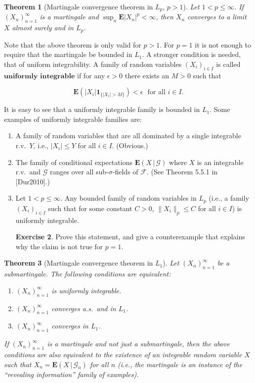 \documentclass[11pt]{report}
\theoremstyle{plain}
\newtheorem{thm}{Theorem}[chapter]
\theoremstyle{definition}
\newtheorem{xexercise}[thm]{Exercise}
\begin{document}
\begin{thm}[Martingale convergence theorem in $L_p$, $p>1$]
Let $1<p\le \infty$. If $(X_n)_{n=1}^\infty$ is a martingale and $\sup_n \mathbf{E} |X_n|^p<\infty$, then $X_n$ converges to a limit $X$ almost surely and in $L_p$.
\end{thm}

Note that the above theorem is only valid for $p>1$. For $p=1$ it is not enough to require that the martingale be bounded in $L_1$. A stronger condition is needed, that of uniform integrability. A family of random variables $(X_i)_{i\in I}$ is called $\textbf{uniformly integrable}$ if for any $\epsilon>0$ there exists an $M>0$ such that

\[
\mathbf{E}( |X_i| \mathbf{1}_{\{|X_i|>M\}} ) < \epsilon \ \ \ \textrm{for all }i\in I.
\]

It is easy to see that a uniformly integrable family is bounded in $L_1$. Some examples of uniformly integrable families are:

\begin{enumerate}[label=\arabic*.]
\item A family of random variables that are all dominated by a single integrable r.v.\ $Y$, i.e., $|X_i|\le Y$ for all $i\in I$. (Obvious.)
\item The family of conditional expectations $\mathbf{E}\left(X\,|\,\mathcal{G}\right)$ where $X$ is an integrable r.v.\ and $\mathcal{G}$ ranges over all sub-$\sigma$-fields of $\mathcal{F}$. (See Theorem 5.5.1 in [Dur2010].)
\item Let $1< p\le \infty$. Any bounded family of random variables in $L_p$ (i.e., a family $(X_i)_{i\in I}$ such that for some constant $C>0$, $\lVert X_i \rVert_p\le C$ for all $i\in I$) is uniformly integrable.

\begin{xexercise}
Prove this statement, and give a counterexample that explains why the claim is not true for $p=1$.
\end{xexercise}
\end{enumerate}

\begin{thm}[Martingale convergence theorem in $L_1$]
Let $(X_n)_{n=1}^\infty$ be a submartingale. The following conditions are equivalent:

\begin{enumerate}[label=\arabic*.]
\item $(X_n)_{n=1}^\infty$ is uniformly integrable.
\item $(X_n)_{n=1}^\infty$ converges a.s.\ and in $L_1$.
\item $(X_n)_{n=1}^\infty$ converges in $L_1$.
\end{enumerate}

If $(X_n)_{n=1}^\infty$ is a martingale and not just a submartingale, then the above conditions are also equivalent to the existence of an integrable random variable $X$ such that $X_n = \mathbf{E}\left(X\,|\,\mathcal{G}_n\right)$ for all $n$ (i.e., the martingale is an instance of the ``revealing information'' family of examples).
\end{thm}
\end{document}
